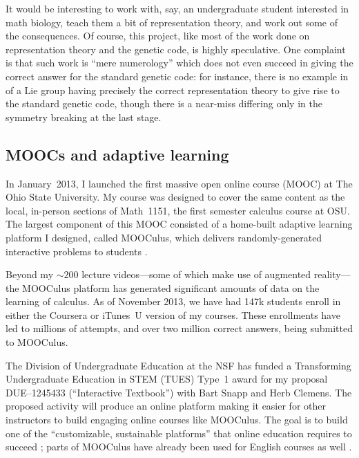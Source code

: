 \documentclass[12pt]{amsart}
\theoremstyle{definition}
\begin{document}
\begin{description}
It would be interesting to work with, say, an undergraduate student
interested in math biology, teach them a bit of representation theory,
and work out some of the consequences.  Of course, this project, like
most of the work done on representation theory and the genetic code,
is highly speculative.  One complaint is that such work is ``mere
numerology'' which does not even succeed in giving the correct answer
for the standard genetic code: for instance, there is no example in
\cite{forger-1999,forger-1998} of a Lie group having precisely the
correct representation theory to give rise to the standard genetic
code, though there is a near-miss differing only in the symmetry
breaking at the last stage.
\end{description}

\subsection{MOOCs and adaptive learning}
\label{subsection:moocs}

In January~2013, I launched the first massive open online course
(MOOC) at The Ohio State University. My course was designed to cover
the same content as the local, in-person sections of Math~1151, the
first semester calculus course at OSU.  The largest component of this
MOOC consisted of a home-built adaptive learning platform I designed,
called MOOCulus, which delivers randomly-generated interactive
problems to students \cite{evans}.  

Beyond my $\sim 200$ lecture videos---some of which make use of
augmented reality---the MOOCulus platform has generated significant
amounts of data on the learning of calculus.  As of November 2013, we
have had 147k students enroll in either the Coursera or iTunes~U
version of my courses.  These enrollments have led to millions of
attempts, and over two million correct answers, being submitted to
MOOCulus.

The Division of Undergraduate Education at the NSF has funded a
Transforming Undergraduate Education in STEM (TUES) Type~1 award for
my proposal DUE--1245433 (``Interactive Textbook'') with Bart Snapp
and Herb Clemens.  The proposed activity will produce an online
platform making it easier for other instructors to build engaging
online courses like MOOCulus.  The goal is to build one of the
``customizable, sustainable platforms'' that online education requires
to succeed \cite{bowen2013higher}; parts of MOOCulus have already been
used for English courses as well \cite{gates-foundation-grant}.
\end{document}
